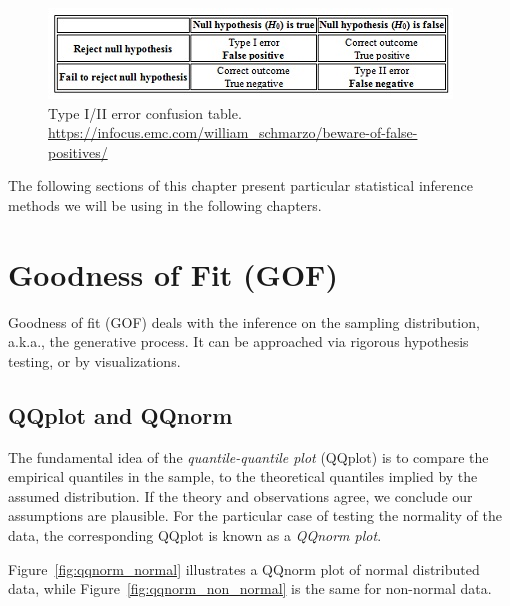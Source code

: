 \begin{figure}
\centering
\includegraphics[width=0.8\linewidth]{art/Beware-of-False-Positives-Chart-1}
\caption[Confusion Table]{Type I/II error confusion table. \newline \url{https://infocus.emc.com/william_schmarzo/beware-of-false-positives/}}
\label{fig:confusion_table}
\end{figure}


The following sections of this chapter present particular statistical inference methods we will be using in the following chapters.


\section{Goodness of Fit (GOF)}

Goodness of fit (GOF) deals with the inference on the sampling distribution, a.k.a., the generative process.
It can be approached via rigorous hypothesis testing, or by visualizations.

\subsection{QQplot and QQnorm}
\label{sec:qqplot}

The fundamental idea of the \emph{quantile-quantile plot} (QQplot) is to compare the empirical quantiles in the sample, to the theoretical quantiles implied by the assumed distribution. If the theory and observations agree, we conclude our assumptions are plausible. 
For the particular case of testing the normality of the data, the corresponding QQplot is known as a \emph{QQnorm plot}.

Figure~\ref{fig:qqnorm_normal} illustrates a QQnorm plot of normal distributed data, while Figure~\ref{fig:qqnorm_non_normal} is the same for non-normal data.


